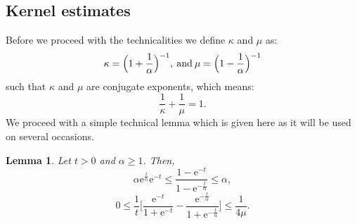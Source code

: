 \documentclass[a4paper,oneside,10pt]{amsproc}
\newtheorem{lemma}{Lemma}
\theoremstyle{remark}
\renewcommand{\leq}{\leqslant}
\renewcommand{\leq}{\leqslant}
\renewcommand{\geq}{\geqslant}
\newcommand{\e}{\mathrm{e}} %
\renewcommand{\leq}{\leqslant}%
\renewcommand{\geq}{\geqslant}%
\begin{document}
\subsection{Kernel estimates}
Before we proceed with the technicalities we define $\kappa$ and
$\mu$ as:
\begin{equation*}
  \kappa = \Bigl(1 + \frac1\alpha \Bigr)^{-1}, \: \text{and} \: \mu
  = \Bigl(1 - \frac1\alpha \Bigr)^{-1}
\end{equation*}
such that $\kappa$ and $\mu$ are conjugate exponents, which means:
\begin{equation*}
  \frac1{\kappa} + \frac1{\mu} = 1.
\end{equation*}
We proceed with a simple technical lemma which is given here as it
will be used on several occasions.
\begin{lemma}\label{lem:Time-part-Mehler-time-transform}
  Let $t > 0$ and $\alpha \geq 1$. Then,
  \begin{equation}
    \label{eq:Time-part-Mehler-time-transform-1}
    \alpha \e^{\frac{t}{\alpha}} \e^{-t} \leq \frac{1 -
      \e^{-t}}{1 - \e^{-\frac{t}{\alpha}}} \leq \alpha,
  \end{equation}
  \begin{equation}
    \label{eq:Time-part-Mehler-time-transform-2}
    0 \leq \frac1t \biggl[\frac{\e^{-t}}{1 + \e^{-t}} -
    \frac{\e^{-\frac{t}\alpha}}{1 + \e^{-\frac{t}{\alpha}}} \biggr]
    \leq \frac{1}{4 \mu}.
  \end{equation}
\end{lemma}
\end{document}
